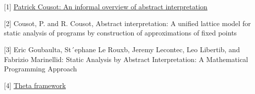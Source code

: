 \chapter*{}
\label{sec:ref}

[1] \hyperref[src:http://web.mit.edu/16.399/www/lecture_01-intro/Cousot_MIT_2005_Course_01_4-1.pdf]{Patrick Cousot: An informal overview of abstract interpretation}

[2] Cousot, P. and R. Cousot, Abstract interpretation: A unified lattice model for static analysis of programs
by construction of approximations of fixed points

[3] Eric Goubaulta, St´ephane Le Rouxb, Jeremy Lecontec, Leo Libertib, and Fabrizio Marinellid: Static Analysis by Abstract Interpretation: A Mathematical Programming Approach

[4] \hyperref[src:https://inf.mit.bme.hu/en/theta]{Theta framework}